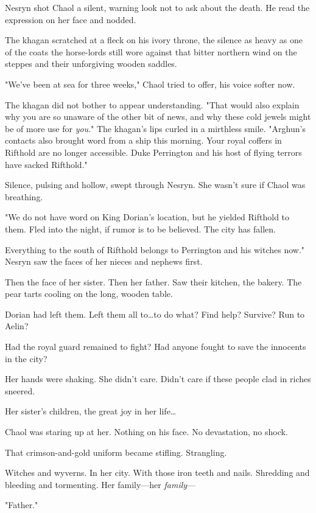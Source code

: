 Nesryn shot Chaol a silent, warning look not to ask about the death. He read the expression on her face and nodded.

The khagan scratched at a fleck on his ivory throne, the silence as heavy as one of the coats the horse-lords still wore against that bitter northern wind on the steppes and their unforgiving wooden saddles.

"We've been at sea for three weeks," Chaol tried to offer, his voice softer now.

The khagan did not bother to appear understanding. "That would also explain why you are so unaware of the other bit of news, and why these cold jewels might be of more use for \emph{you}." The khagan's lips curled in a mirthless smile. "Arghun's contacts also brought word from a ship this morning. Your royal coffers in Rifthold are no longer accessible. Duke Perrington and his host of flying terrors have sacked Rifthold."

Silence, pulsing and hollow, swept through Nesryn. She wasn't sure if Chaol was breathing.

"We do not have word on King Dorian's location, but he yielded Rifthold to them. Fled into the night, if rumor is to be believed. The city has fallen.

Everything to the south of Rifthold belongs to Perrington and his witches now." Nesryn saw the faces of her nieces and nephews first.

Then the face of her sister. Then her father. Saw their kitchen, the bakery. The pear tarts cooling on the long, wooden table.

Dorian had left them. Left them all to\ldots to do what? Find help? Survive? Run to Aelin?

Had the royal guard remained to fight? Had anyone fought to save the innocents in the city?

Her hands were shaking. She didn't care. Didn't care if these people clad in riches sneered.

Her sister's children, the great joy in her life\ldots

Chaol was staring up at her. Nothing on his face. No devastation, no shock.

That crimson-and-gold uniform became stifling. Strangling.

Witches and wyverns. In her city. With those iron teeth and nails. Shredding and bleeding and tormenting. Her family---her \emph{family}---

"Father."

